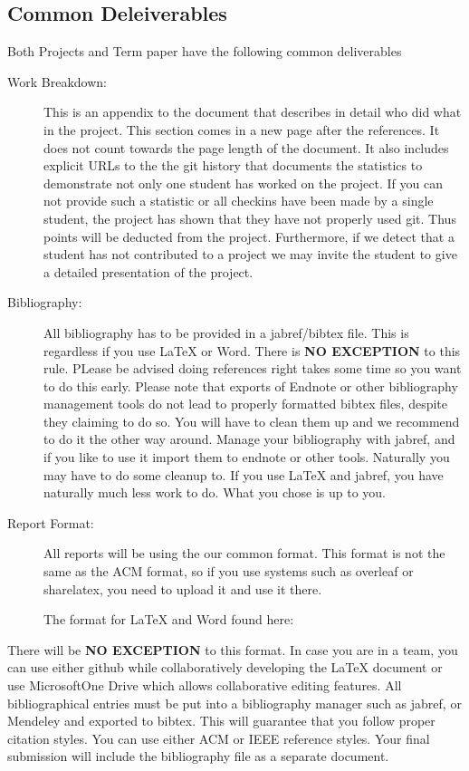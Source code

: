 \subsection{Common Deleiverables}

Both Projects and Term paper have the following common deliverables

\begin{description}
\item[Work Breakdown:]
This is an appendix to the document that describes in detail who did
what in the project. This section comes in a new page after the
references. It does not count towards the page length of the document.
It also includes explicit URLs to the the git history that documents the
statistics to demonstrate not only one student has worked on the
project. If you can not provide such a statistic or all checkins have
been made by a single student, the project has shown that they have not
properly used git. Thus points will be deducted from the project.
Furthermore, if we detect that a student has not contributed to a
project we may invite the student to give a detailed presentation of the
project.
\item[Bibliography:]
All bibliography has to be provided in a jabref/bibtex file. This is
regardless if you use LaTeX or Word. There is \textbf{NO EXCEPTION} to
this rule. PLease be advised doing references right takes some time so
you want to do this early. Please note that exports of Endnote or other
bibliography management tools do not lead to properly formatted bibtex
files, despite they claiming to do so. You will have to clean them up
and we recommend to do it the other way around. Manage your bibliography
with jabref, and if you like to use it import them to endnote or other
tools. Naturally you may have to do some cleanup to. If you use LaTeX
and jabref, you have naturally much less work to do. What you chose is
up to you.
\item[Report Format:]
All reports will be using the our common format. This format is not the
same as the ACM format, so if you use systems such as overleaf or
sharelatex, you need to upload it and use it there.

The format for LaTeX and Word found here:


\end{description}

There will be \textbf{NO EXCEPTION} to this format. In case you are in a
team, you can use either github while collaboratively developing the
LaTeX document or use MicrosoftOne Drive which allows collaborative
editing features. All bibliographical entries must be put into a
bibliography manager such as jabref, or Mendeley and exported
to bibtex. This will
guarantee that you follow proper citation styles. You can use either ACM
or IEEE reference styles. Your final submission will include the
bibliography file as a separate document.

